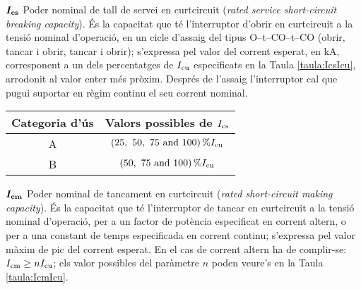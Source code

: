 \begin{list}{}
    \item[$\boldsymbol{I_\mathrm{cs}}$] Poder nominal de tall de servei en curtcircuit (\textit{rated service  short-circuit breaking capacity}). És la capacitat que té l'interruptor d'obrir en curtcircuit a la tensió nominal d'operació, en un cicle d'assaig del tipus O--t--CO--t--CO (obrir, tancar i obrir, tancar i obrir); s'expressa pel valor  del corrent esperat, en kA, corresponent a un dels percentatges de $I_\mathrm{cu}$ especificats en la Taula \vref{taula:IcsIcu}, arrodonit al valor enter més pròxim. Després de l'assaig l'interruptor cal que pugui suportar en règim continu  el seu corrent nominal.

        \begin{center}
            \label{taula:IcsIcu}
           \begin{tabular}{cc}
           \toprule[1pt]
           Categoria d'ús &  Valors possibles de $I_\mathrm{cs}$ \\
           \midrule
           A & $\qtylist[list-units = brackets]{25;50;75;100}{\percent} I\ped{cu}$ \\
           B & $\qtylist[list-units = brackets]{50;75;100}{\percent} I\ped{cu}$  \\
           \bottomrule[1pt]
           \end{tabular}
         \end{center}
    \item[$\boldsymbol{I_\mathrm{cm}}$] Poder nominal de tancament en curtcircuit (\textit{rated short-circuit making capacity}). És la capacitat que té l'interruptor de tancar en curtcircuit a la tensió nominal d'operació, per a un factor de potència especificat en corrent altern, o per a una constant de temps especificada en corrent continu; s'expressa pel valor màxim de pic del corrent esperat. En el cas de corrent altern ha de complir-se: $I_\mathrm{cm} \geq n I_\mathrm{cu}$; els valor possibles del paràmetre $n$ poden veure's en la Taula \vref{taula:IcmIcu}.


\end{list}
